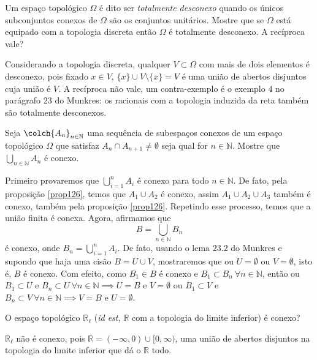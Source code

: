 \begin{Mybox}
Um espaço topológico $\Omega$ é dito ser \emph{totalmente desconexo} quando os únicos subconjuntos conexos de $\Omega$ são os conjuntos unitários. Mostre que se $\Omega$ está equipado com a topologia discreta então $\Omega$ é totalmente desconexo. A recíproca vale?
\vspace{-.4cm}
\end{Mybox}
\vspace{-.5cm}
\begin{dem}
Considerando a topologia discreta, qualquer $V \subset \Omega$ com mais de dois elementos é desconexo, pois fixado $x \in V$, $\{x\} \cup V \setminus \{x \} = V$ é uma união de abertos disjuntos cuja união é $V$. A recíproca não vale, um contra-exemplo é o exemplo $4$ no parágrafo $23$ do Munkres: os racionais com a topologia induzida da reta também são totalmente desconexos.
\end{dem}



\begin{Mybox}
Seja $\colch{A_n}_{n \in \mathbb{N}}$ uma sequência de subespaços conexos de um espaço topológico $\Omega$ que satisfaz $A_n \cap A_{n+1}\neq \emptyset$ seja qual for $n \in \mathbb{N}$. Mostre que $\bigcup_{n \in \mathbb{N}} A_n$ é conexo.  
\vspace{-.4cm}
\end{Mybox}
\vspace{-.5cm}
\begin{dem}
Primeiro provaremos que $\displaystyle{\bigcup_{i = 1}^{n} A_i}$ é conexo para todo $n \in \mathbb{N}$. De fato, pela proposição \cref{prop126}, temos que $A_1 \cup A_2$ é conexo, assim $A_1 \cup A_2 \cup A_3$ também é conexo, também pela proposição \cref{prop126}. Repetindo esse processo, temos que a união finita é conexa. Agora, afirmamos que $$B = \displaystyle{\bigcup_{n \in \mathbb{N}} B_n}$$ é conexo, onde $B_n = \displaystyle{\bigcup_{i = 1}^{n} A_i}$. De fato, usando o lema $23.2$ do Munkres e supondo que haja uma cisão $B = U \cup V$, mostraremos que ou $U = \emptyset$ ou $V = \emptyset$, isto é, $B$ é conexo. Com efeito, como $B_1 \in B$ é conexo e $B_1 \subset B_n \ \forall n \in \mathbb{N}$, então ou $B_1 \subset U $ e $B_n \subset U \ \forall n \in \mathbb{N} \implies U = B \text{ e } V = \emptyset $ ou $B_1 \subset V $ e $B_n \subset V \ \forall n \in \mathbb{N} \implies V = B \text{ e } U = \emptyset$.
\end{dem}


\begin{Mybox}
O espaço topológico $\mathbb{R}_{\ell}$ (\textit{id est,} $\mathbb{R}$ com a topologia do limite inferior) é conexo?
\vspace{-.4cm}
\end{Mybox}
\vspace{-.5cm}
\begin{dem}
 $\mathbb{R}_{\ell}$ não é conexo, pois $\mathbb{R} = (-\infty, 0) \cup [0, \infty)$, uma união de abertos disjuntos na topologia do limite inferior que dá o $\mathbb{R}$ todo.
\end{dem}



